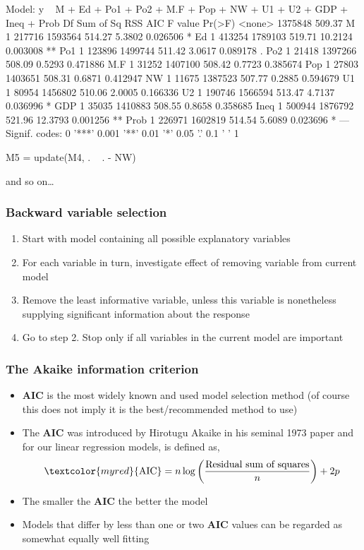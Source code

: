 \documentclass[a4paper]{article}
\begin{document}
\begin{Schunk}
\begin{Soutput}
Model:
y ~ M + Ed + Po1 + Po2 + M.F + Pop + NW + U1 + U2 + GDP + Ineq + 
    Prob
       Df Sum of Sq     RSS    AIC F value   Pr(>F)   
<none>              1375848 509.37                    
M       1    217716 1593564 514.27  5.3802 0.026506 * 
Ed      1    413254 1789103 519.71 10.2124 0.003008 **
Po1     1    123896 1499744 511.42  3.0617 0.089178 . 
Po2     1     21418 1397266 508.09  0.5293 0.471886   
M.F     1     31252 1407100 508.42  0.7723 0.385674   
Pop     1     27803 1403651 508.31  0.6871 0.412947   
NW      1     11675 1387523 507.77  0.2885 0.594679   
U1      1     80954 1456802 510.06  2.0005 0.166336   
U2      1    190746 1566594 513.47  4.7137 0.036996 * 
GDP     1     35035 1410883 508.55  0.8658 0.358685   
Ineq    1    500944 1876792 521.96 12.3793 0.001256 **
Prob    1    226971 1602819 514.54  5.6089 0.023696 * 
---
Signif. codes:  0 '***' 0.001 '**' 0.01 '*' 0.05 '.' 0.1 ' ' 1
\end{Soutput}
\begin{Sinput}
M5 = update(M4, . ~ . - NW)
\end{Sinput}
\end{Schunk}
and so on\dots
\subsubsection{Backward variable selection}
\begin{enumerate}
	\item Start with model containing \textcolor{myred}{all} possible explanatory variables
	\item For each variable in turn, investigate effect of removing variable from current model
	\item \textcolor{myred}{Remove the least informative variable}, unless this variable is nonetheless supplying significant information about the response
	\item Go to step 2. Stop only if all variables in the current model are important
\end{enumerate}
\subsubsection{The Akaike information criterion}
\begin{itemize}
	\item \textcolor{myred}{\textbf{AIC}} is the most widely known and used model selection method (of course this does not imply it is the best/recommended method to use)
	\item The \textcolor{myred}{\textbf{AIC}} was introduced by Hirotugu Akaike in his seminal 1973 paper and for our linear regression models, is defined as,
	\[
		\textcolor{myred}{\text{AIC}} = n\log\left(\frac{\text{Residual sum of squares}}{n}\right) + 2p
	\]
	\item The smaller the \textcolor{myred}{\textbf{AIC}} the better the model
	\item Models that differ by less than one or two \textcolor{myred}{\textbf{AIC}} values can be regarded as somewhat equally well fitting
\end{itemize}
\end{document}
